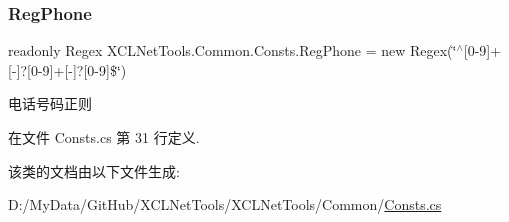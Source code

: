 \subsubsection{\texorpdfstring{Reg\+Phone}{RegPhone}}
{\footnotesize\ttfamily readonly Regex X\+C\+L\+Net\+Tools.\+Common.\+Consts.\+Reg\+Phone = new Regex(\char`\"{}$^\wedge$\mbox{[}0-\/9\mbox{]}+\mbox{[}-\/\mbox{]}?\mbox{[}0-\/9\mbox{]}+\mbox{[}-\/\mbox{]}?\mbox{[}0-\/9\mbox{]}\$\char`\"{})\hspace{0.3cm}{\ttfamily [static]}}



电话号码正则 



在文件 Consts.\+cs 第 31 行定义.



该类的文档由以下文件生成\+:\begin{DoxyCompactItemize}
\item 
D\+:/\+My\+Data/\+Git\+Hub/\+X\+C\+L\+Net\+Tools/\+X\+C\+L\+Net\+Tools/\+Common/\hyperlink{_consts_8cs}{Consts.\+cs}\end{DoxyCompactItemize}
